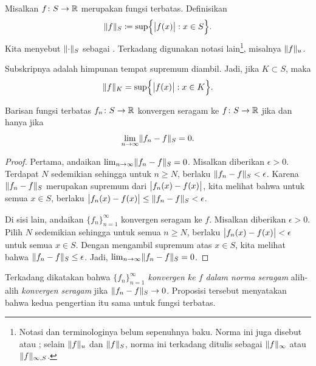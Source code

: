 \begin{defn} \label{def:unifnorm}
Misalkan $f \colon S \to {\mathbb{R}}$ merupakan fungsi terbatas.  Definisikan
\begin{equation*}
\snorm{f}_S \coloneqq
\sup \Bigl\{ \babs{f(x)} : x \in S \Bigr\} .
\avoidbreak
\end{equation*}
Kita menyebut $\lVert {\cdot} \rVert_S$ sebagai \emph{}.
Terkadang digunakan notasi lain\footnote{Notasi dan terminologinya
belum sepenuhnya baku.  Norma ini juga disebut
\emph{} atau
\emph{}; selain
$\lVert {f} \rVert_u$ dan $\lVert {f} \rVert_S$, norma ini terkadang ditulis
sebagai $\lVert {f} \rVert_{\infty}$ atau $\lVert {f} \rVert_{\infty,S}$.},
misalnya $\lVert {f} \rVert_u$.
\end{defn}

Subskripnya adalah himpunan tempat supremum diambil.
Jadi, jika $K \subset S$, maka
\begin{equation*}
\lVert {f} \rVert_K =
\sup \Bigl\{ \bigl\lvert {f(x)} \bigr\rvert : x \in K \Bigr\} .
\end{equation*}

\begin{prop}
Barisan fungsi terbatas $f_n \colon S \to {\mathbb{R}}$ konvergen
seragam ke $f \colon S \to {\mathbb{R}}$ jika dan hanya jika
\begin{equation*}
\lim_{n\to\infty} \lVert {f_n - f} \rVert_S = 0 .
\end{equation*}
\end{prop}

\begin{proof}
Pertama, andaikan
$\lim_{n\to\infty} \lVert {f_n - f} \rVert_S = 0$.  Misalkan diberikan
$\epsilon > 0$.  Terdapat $N$ sedemikian sehingga
untuk $n \geq N$, berlaku $\lVert {f_n - f} \rVert_S < \epsilon$.  Karena $\lVert {f_n-f} \rVert_S$
merupakan supremum dari $\bigl\lvert {f_n(x)-f(x)} \bigr\rvert$, kita melihat bahwa untuk semua $x \in S$,
berlaku $\bigl\lvert {f_n(x)-f(x)} \bigr\rvert \leq \lVert {f_n - f} \rVert_S < \epsilon$.

Di sisi lain, andaikan $\{ f_n \}_{n=1}^\infty$ konvergen seragam ke $f$.
Misalkan diberikan $\epsilon > 0$.  Pilih $N$ sedemikian sehingga
untuk semua $n \geq N$, berlaku
$\bigl\lvert {f_n(x)-f(x)} \bigr\rvert < \epsilon$ untuk semua $x \in S$.
Dengan mengambil supremum atas $x \in S$, kita melihat bahwa
$\lVert {f_n - f} \rVert_S \leq \epsilon$.  Jadi, $\lim_{n\to\infty} \lVert {f_n-f} \rVert_S = 0$.
\end{proof}

Terkadang dikatakan bahwa
\emph{$\{ f_n \}_{n=1}^\infty$ konvergen ke $f$ dalam norma seragam}%
alih-alih \emph{konvergen seragam} jika $\lVert {f_n-f} \rVert_S \to 0$.  Proposisi tersebut
menyatakan bahwa kedua pengertian itu sama untuk fungsi terbatas.

